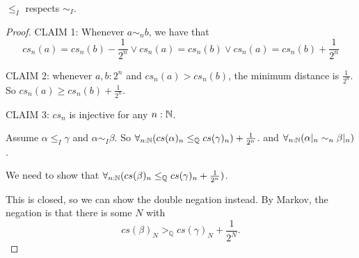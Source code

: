 \begin{lemma}
  $\leq_I$ respects $\sim_I$. 
\end{lemma}
\begin{proof}

  CLAIM 1: 
  Whenever $a\sim_n b$, we have that 
  \begin{equation} 
    cs_n(a) = cs_n(b) - \frac{1}{2^n}
    \vee
    cs_n(a) = cs_n(b) 
    \vee
    cs_n(a) = cs_n(b) + \frac{1}{2^n}
  \end{equation}
  
  CLAIM 2: 
  whenever $a,b:2^n$ and $cs_n(a) > cs_n(b)$, the minimum distance is $\frac{1}{2^n}$. 
  So $cs_n(a) \geq cs_n(b) + \frac{1}{2^n} $. 

  CLAIM 3: 
  $cs_n$ is injective for any $n:\mathbb{N}$. 

  Assume $\alpha\leq_I \gamma$ and $\alpha\sim_I\beta$. 
  So 
  $\forall_{n:\mathbb{N}} (cs(\alpha)_n \leq_\mathbb Q cs(\gamma)_n)+\frac{1}{2^n}$. 
  and $\forall_{n:\mathbb{N}}(\alpha|_n\sim_n\beta|_n)$. 

  We need to show that 
  $\forall_{n:\mathbb{N}} (cs(\beta)_n \leq_\mathbb Q cs(\gamma)_n+ \frac{1}{2^n} ) $. 

  This is closed, so we can show the double negation instead. 
  By Markov, the negation is that there is some 
  $N$ with 
  $$cs(\beta)_N >_\mathbb Q cs(\gamma)_N + \frac{1}{2^N}.$$
  

\end{proof}
